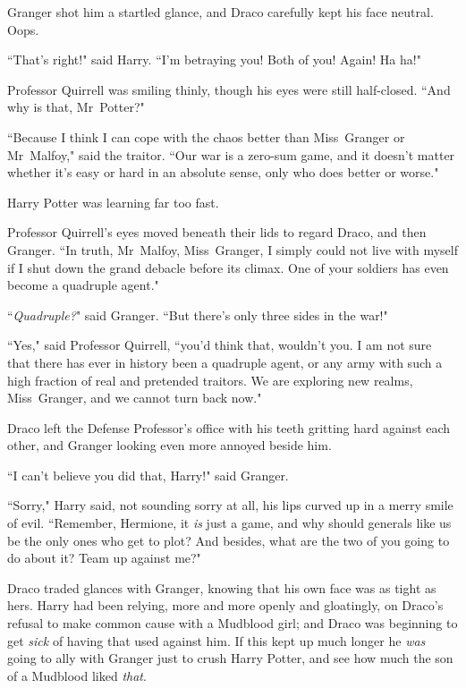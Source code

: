 Granger shot him a startled glance, and Draco carefully kept his face neutral. Oops.

``That's right!" said Harry. ``I'm betraying you! Both of you! Again! Ha ha!"

Professor Quirrell was smiling thinly, though his eyes were still half-closed. ``And why is that, Mr~Potter?"

``Because I think I can cope with the chaos better than Miss~Granger or Mr~Malfoy," said the traitor. ``Our war is a zero-sum game, and it doesn't matter whether it's easy or hard in an absolute sense, only who does better or worse."

Harry Potter was learning far too fast.

Professor Quirrell's eyes moved beneath their lids to regard Draco, and then Granger. ``In truth, Mr~Malfoy, Miss~Granger, I simply could not live with myself if I shut down the grand debacle before its climax. One of your soldiers has even become a quadruple agent."

``\emph{Quadruple?}" said Granger. ``But there's only three sides in the war!"

``Yes," said Professor Quirrell, ``you'd think that, wouldn't you. I am not sure that there has ever in history been a quadruple agent, or any army with such a high fraction of real and pretended traitors. We are exploring new realms, Miss~Granger, and we cannot turn back now."

Draco left the Defense Professor's office with his teeth gritting hard against each other, and Granger looking even more annoyed beside him.

``I can't believe you did that, Harry!" said Granger.

``Sorry," Harry said, not sounding sorry at all, his lips curved up in a merry smile of evil. ``Remember, Hermione, it \emph{is} just a game, and why should generals like us be the only ones who get to plot? And besides, what are the two of you going to do about it? Team up against me?"

Draco traded glances with Granger, knowing that his own face was as tight as hers. Harry had been relying, more and more openly and gloatingly, on Draco's refusal to make common cause with a Mudblood girl; and Draco was beginning to get \emph{sick} of having that used against him. If this kept up much longer he \emph{was} going to ally with Granger just to crush Harry Potter, and see how much the son of a Mudblood liked \emph{that}.

\later

